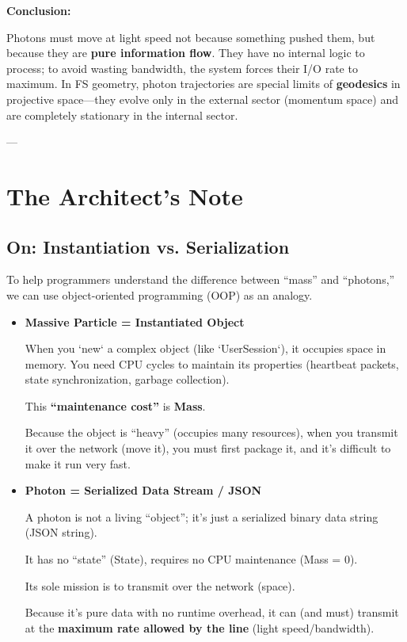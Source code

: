 \documentclass[11pt,a4paper,twoside]{book}
\begin{document}
\textbf{Conclusion:}

Photons must move at light speed not because something pushed them, but because they are \textbf{pure information flow}. They have no internal logic to process; to avoid wasting bandwidth, the system forces their I/O rate to maximum. In FS geometry, photon trajectories are special limits of \textbf{geodesics} in projective space---they evolve only in the external sector (momentum space) and are completely stationary in the internal sector.

---

\section{The Architect's Note}

\subsection{On: Instantiation vs. Serialization}

To help programmers understand the difference between ``mass'' and ``photons,'' we can use object-oriented programming (OOP) as an analogy.

\begin{itemize}
\item \textbf{Massive Particle = Instantiated Object}

    When you `new` a complex object (like `UserSession`), it occupies space in memory. You need CPU cycles to maintain its properties (heartbeat packets, state synchronization, garbage collection).

    This \textbf{``maintenance cost''} is \textbf{Mass}.

    Because the object is ``heavy'' (occupies many resources), when you transmit it over the network (move it), you must first package it, and it's difficult to make it run very fast.

\item \textbf{Photon = Serialized Data Stream / JSON}

    A photon is not a living ``object''; it's just a serialized binary data string (JSON string).

    It has no ``state'' (State), requires no CPU maintenance (Mass = 0).

    Its sole mission is to transmit over the network (space).

    Because it's pure data with no runtime overhead, it can (and must) transmit at the \textbf{maximum rate allowed by the line} (light speed/bandwidth).
\end{itemize}
\end{document}
